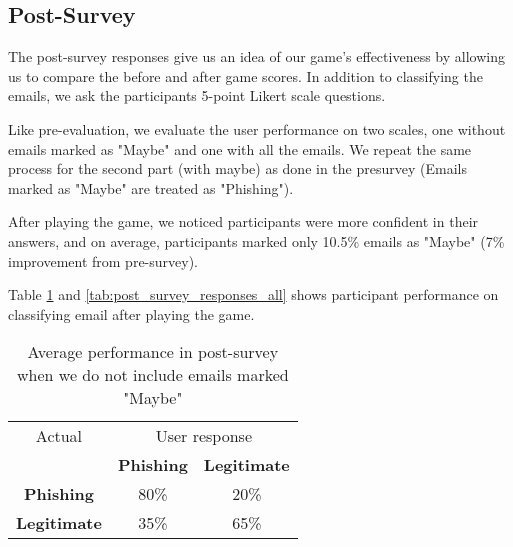 \subsection{Post-Survey}
The post-survey responses give us an idea of our game's effectiveness by allowing us to compare the before and after game scores. In addition to classifying the emails, we ask the participants 5-point Likert scale questions.

Like pre-evaluation, we evaluate the user performance on two scales, one without emails marked as "Maybe" and one with all the emails. We repeat the same process for the second part (with maybe) as done in the presurvey (Emails marked as "Maybe" are treated as "Phishing").

After playing the game, we noticed participants were more confident in their answers, and on average, participants marked only 10.5\% emails as "Maybe" (7\% improvement from pre-survey).

Table \ref{tab:post_survey_responses} and \ref{tab:post_survey_responses_all} shows participant performance on classifying email after playing the game.


\begin{table}[!ht]
    \begin{center}

        \begin{tabular}{c | c c}
            Actual              & \multicolumn{2}{c}{User response}                       \\
                                & \textbf{Phishing}                 & \textbf{Legitimate} \\
            \textbf{Phishing}   & 80\%                              & 20\%                \\
            \textbf{Legitimate} & 35\%                              & 65\%                \\
        \end{tabular}
        \caption[Average performance in post-survey (I)]{Average performance in post-survey when we do not include emails marked "Maybe"}
        \label{tab:post_survey_responses}
    \end{center}
\end{table}


